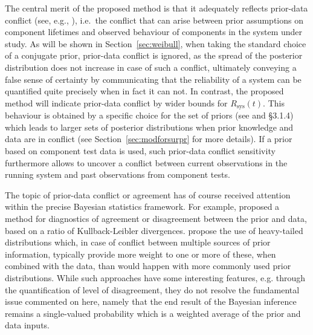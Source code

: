 \documentclass[Journal,letterpaper]{ascelike-new}
\newcommand{\Rsys}{R_\text{sys}}
\def\Rsys{R_\text{sys}}
\begin{document}
The central merit of the proposed method is that it adequately reflects prior-data conflict
(see, e.g., ),
i.e.\ the conflict that can arise between prior assumptions on component lifetimes
and observed behaviour of components in the system under study.
As will be shown in Section~\ref{sec:weibull}, when taking the standard choice of a conjugate prior,
prior-data conflict is ignored, as the spread of the posterior distribution does not increase in case of such a conflict,
ultimately conveying a false sense of certainty
by communicating that the reliability of a system can be quantified quite precisely when in fact it can not.
%
In contrast, the proposed method will indicate prior-data conflict by wider bounds for $\Rsys(t)$.
This behaviour is obtained by a specific choice for the set of priors (see  and  \S 3.1.4)
which leads to larger sets of posterior distributions when prior knowledge and data are in conflict
(see Section~\ref{sec:modforsurpr} for more details).
If a prior based on component test data is used,
such prior-data conflict sensitivity furthermore allows to uncover a conflict between
current observations in the running system and past observations from component tests.

The topic of prior-data conflict or agreement has of course received attention within the precise Bayesian statistics framework.
For example,  proposed a method for diagnostics of agreement or disagreement between the prior and data,
based on a ratio of Kullback-Leibler divergences.
 propose the use of heavy-tailed distributions which,
in case of conflict between multiple sources of prior information,
typically provide more weight to one or more of these, when combined with the data,
than would happen with more commonly used prior distributions.
While such approaches have some interesting features, e.g. through the quantification of level of disagreement,
they do not resolve the fundamental issue commented on here,
namely that the end result of the Bayesian inference remains a single-valued probability
which is a weighted average of the prior and data inputs.
\end{document}
